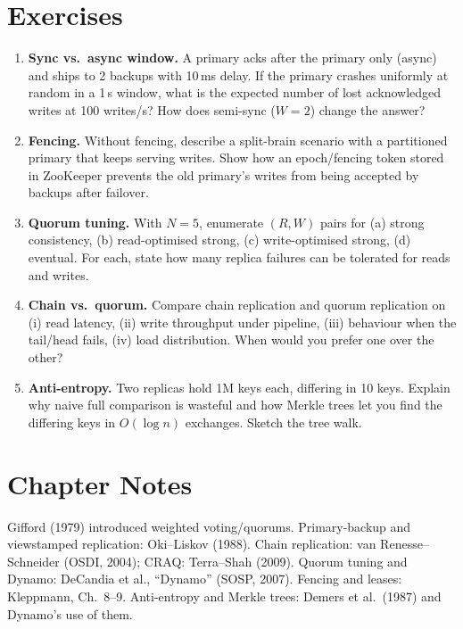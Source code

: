 \section{Exercises}
\label{sec:ch05-exercises}
\begin{enumerate}[label=E5.\arabic*, leftmargin=*, itemsep=0.6em]
    \item \textbf{Sync vs.\ async window.} A primary acks after the primary only (async) and ships to 2 backups with 10\,ms delay. If the primary crashes uniformly at random in a 1\,s window, what is the expected number of lost acknowledged writes at 100 writes/s? How does semi-sync ($W=2$) change the answer?
    \item \textbf{Fencing.} Without fencing, describe a split-brain scenario with a partitioned primary that keeps serving writes. Show how an epoch/fencing token stored in ZooKeeper prevents the old primary's writes from being accepted by backups after failover.
    \item \textbf{Quorum tuning.} With $N=5$, enumerate $(R,W)$ pairs for (a) strong consistency, (b) read-optimised strong, (c) write-optimised strong, (d) eventual. For each, state how many replica failures can be tolerated for reads and writes.
    \item \textbf{Chain vs.\ quorum.} Compare chain replication and quorum replication on (i) read latency, (ii) write throughput under pipeline, (iii) behaviour when the tail/head fails, (iv) load distribution. When would you prefer one over the other?
    \item \textbf{Anti-entropy.} Two replicas hold 1M keys each, differing in 10 keys. Explain why naive full comparison is wasteful and how Merkle trees let you find the differing keys in $O(\log n)$ exchanges. Sketch the tree walk.
\end{enumerate}

\section*{Chapter Notes}
Gifford (1979) introduced weighted voting/quorums. Primary-backup and viewstamped replication: Oki--Liskov (1988). Chain replication: van Renesse--Schneider (OSDI, 2004); CRAQ: Terra--Shah (2009). Quorum tuning and Dynamo: DeCandia et al., ``Dynamo'' (SOSP, 2007). Fencing and leases: Kleppmann, Ch.~8--9. Anti-entropy and Merkle trees: Demers et al.\ (1987) and Dynamo's use of them.

